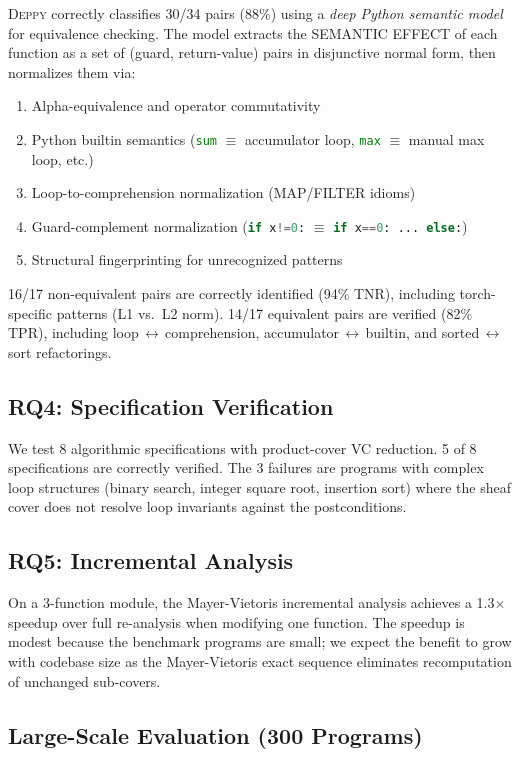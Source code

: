\documentclass[acmsmall,screen,review,anonymous]{acmart}
\theoremstyle{remark}
\newcommand{\py}[1]{\lstinline[language=Python]{#1}}
\begin{document}
\textsc{Deppy} correctly classifies 30/34 pairs (88\%) using a
\emph{deep Python semantic model} for equivalence checking.  The
model extracts the SEMANTIC EFFECT of each function as a set of
(guard, return-value) pairs in disjunctive normal form, then
normalizes them via:
\begin{enumerate}[nosep]
  \item Alpha-equivalence and operator commutativity
  \item Python builtin semantics (\py{sum} $\equiv$ accumulator loop,
    \py{max} $\equiv$ manual max loop, etc.)
  \item Loop-to-comprehension normalization (MAP/FILTER idioms)
  \item Guard-complement normalization (\py{if x!=0:} $\equiv$ \py{if x==0: ... else:})
  \item Structural fingerprinting for unrecognized patterns
\end{enumerate}
16/17 non-equivalent pairs are correctly identified (94\% TNR),
including torch-specific patterns (L1 vs.\ L2 norm).
14/17 equivalent pairs are verified (82\% TPR), including
loop$\,\leftrightarrow\,$comprehension, accumulator$\,\leftrightarrow\,$builtin,
and sorted$\,\leftrightarrow\,$sort refactorings.

\subsection{RQ4: Specification Verification}

We test 8 algorithmic specifications with product-cover VC reduction.
5 of 8 specifications are correctly verified.  The 3 failures are
programs with complex loop structures (binary search, integer square
root, insertion sort) where the sheaf cover does not resolve loop
invariants against the postconditions.

\subsection{RQ5: Incremental Analysis}

On a 3-function module, the Mayer-Vietoris incremental analysis
achieves a 1.3$\times$ speedup over full re-analysis when modifying
one function.  The speedup is modest because the benchmark programs
are small; we expect the benefit to grow with codebase size as the
Mayer-Vietoris exact sequence eliminates recomputation of unchanged
sub-covers.

\subsection{Large-Scale Evaluation (300 Programs)}
\end{document}
